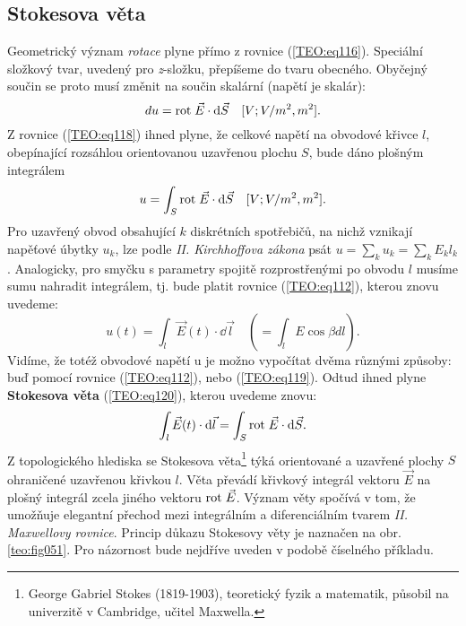      \subsection{Stokesova věta}\label{ES:sec06}
        Geometrický význam \emph{rotace} plyne přímo z rovnice (\ref{TEO:eq116}). Speciální 
        složkový tvar, uvedený pro \emph{z}-složku, přepíšeme do tvaru obecného. Obyčejný součin se 
        proto musí změnit na součin skalární (napětí je skalár):
        \begin{equation}\label{TEO:eq118}
          du = \mathrm{rot}\;\vec{E}\cdot \mathop{}\!\mathrm{d}\vec{S} \quad[V; V/m^2, m^2].
        \end{equation}
        Z rovnice (\ref{TEO:eq118}) ihned plyne, že celkové napětí na obvodové křivce \(l\), 
        obepínající rozsáhlou orientovanou uzavřenou plochu \(S\), bude dáno plošným integrálem
        \begin{equation}\label{TEO:eq119}
          u = \int_S\mathrm{rot}\;\vec{E} \cdot \mathop{}\!\mathrm{d}\vec{S} \quad[V; V/m^2, m^2].
        \end{equation}
        Pro uzavřený obvod obsahující \(k\) diskrétních spotřebičů, na nichž vznikají napěťové 
        úbytky \(u_k\), lze podle \emph{II. Kirchhoffova zákona} psát \(u=\sum_ku_k 
        =\sum_kE_kl_k\). Analogicky, pro smyčku s parametry spojitě rozprostřenými po obvodu \(l\) 
        musíme sumu nahradit integrálem, tj. bude platit rovnice  (\ref{TEO:eq112}), kterou 
        znovu uvedeme:
        \begin{equation*}
          u(t) = \int_{l}\vec{E}(t)\cdot \dd{\vec{l}} \quad (=\int_lE\cos\beta dl).
        \end{equation*}
        Vidíme, že totéž obvodové napětí u je možno vypočítat dvěma různými způsoby: buď pomocí 
        rovnice  (\ref{TEO:eq112}), nebo (\ref{TEO:eq119}). Odtud ihned plyne 
        \textbf{Stokesova věta} (\ref{TEO:eq120}), kterou uvedeme znovu:
        \begin{equation}\label{TEO:eq120}
          \int_{l}\vec{E}(t)\cdot \mathop{}\!\mathrm{d}\vec{l} = \int_S\mathrm{rot}\;\vec{E} \cdot \mathop{}\!\mathrm{d}\vec{S}.
        \end{equation}
        Z topologického hlediska se Stokesova věta\footnote{George Gabriel Stokes (1819-1903), 
        teoretický fyzik a matematik, působil na univerzitě v Cambridge, učitel Maxwella.} týká 
        orientované a uzavřené plochy \(S\) ohraničené uzavřenou křivkou \(l\). Věta převádí 
        křivkový integrál vektoru \(\vec{E}\) na plošný integrál zcela jiného vektoru \(\mathrm{rot}\;\vec{E}\). 
        Význam věty spočívá v tom, že umožňuje elegantní přechod mezi integrálním a diferenciálním 
        tvarem \emph{II. Maxwellovy rovnice}. Princip důkazu Stokesovy věty je naznačen na obr. 
        \ref{teo:fig051}. Pro názornost bude nejdříve uveden v podobě číselného 
        příkladu.
        
